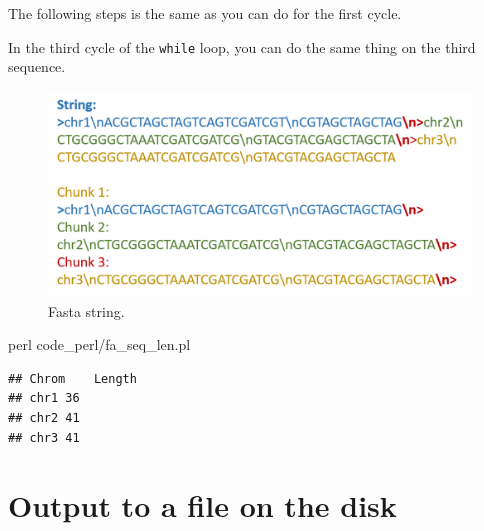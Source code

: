 \documentclass[]{book}
\makeatletter
\newenvironment{Shaded}{\begin{snugshade}}{\end{snugshade}}
\newcommand{\FunctionTok}[1]{\textcolor[rgb]{0.00,0.00,0.00}{#1}}
\newcommand{\NormalTok}[1]{#1}
\newenvironment{kframe}{%
\medskip{}
\setlength{\fboxsep}{.8em}
 \def\at@end@of@kframe{}%
 \ifinner\ifhmode%
  \def\at@end@of@kframe{\end{minipage}}%
  \begin{minipage}{\columnwidth}%
 \fi\fi%
 \def\FrameCommand##1{\hskip\@totalleftmargin \hskip-\fboxsep
 \colorbox{shadecolor}{##1}\hskip-\fboxsep
     \hskip-\linewidth \hskip-\@totalleftmargin \hskip\columnwidth}%
 \MakeFramed {\advance\hsize-\width
   \@totalleftmargin\z@ \linewidth\hsize
   \@setminipage}}%
 {\par\unskip\endMakeFramed%
 \at@end@of@kframe}
\renewenvironment{Shaded}{\begin{kframe}}{\end{kframe}}
\theoremstyle{definition}
\theoremstyle{definition}
\theoremstyle{definition}
\theoremstyle{remark}
\makeatother
\begin{document}
The following steps is the same as you can do for the first cycle.

In the third cycle of the \texttt{while} loop, you can do the same thing
on the third sequence.



\begin{figure}
\centering
\includegraphics{figures/fasta_string.png}
\caption{\label{fig:fastaString}Fasta string.}
\end{figure}

\begin{Shaded}
\begin{Highlighting}[]
\FunctionTok{perl}\NormalTok{ code_perl/fa_seq_len.pl}
\end{Highlighting}
\end{Shaded}

\begin{verbatim}
## Chrom    Length
## chr1 36
## chr2 41
## chr3 41
\end{verbatim}

\section{Output to a file on the
disk}\label{output-to-a-file-on-the-disk}
\end{document}
